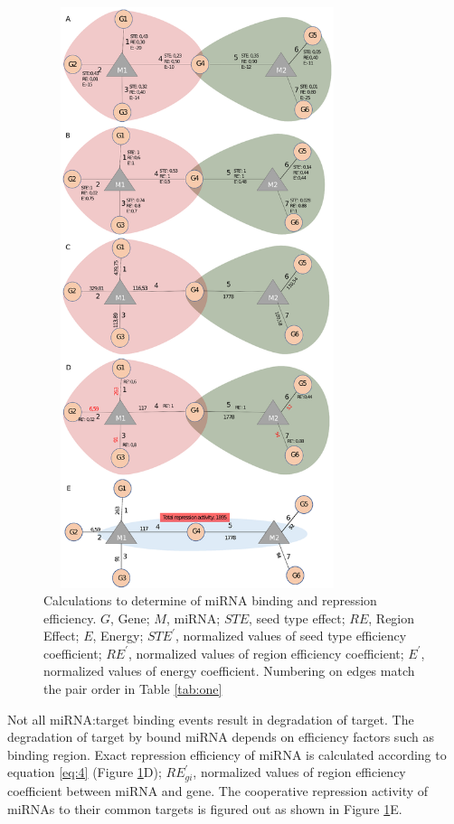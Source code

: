 \documentclass[a4,center,fleqn]{NAR}
\begin{document}
\begin{figure}[ht]
\begin{center}
\includegraphics[width=9cm,height=17cm]{fig2_new.eps}
\end{center}
\caption{Calculations to determine of miRNA binding and repression efficiency. $G$, Gene; $M$, miRNA; $STE$, seed type effect; $RE$, Region Effect; $E$, Energy; $STE^\prime$, normalized values of seed type efficiency coefficient; $RE^\prime$, normalized values of region efficiency coefficient; $E^\prime$, normalized values of energy coefficient. Numbering on edges match the pair order in Table \ref{tab:one} }
\label{fig:fig2}
\end{figure}

Not all miRNA:target binding events result in degradation of target. The
degradation of target by bound miRNA depends on efficiency factors such
as binding region. Exact repression efficiency of miRNA is calculated
according to equation \eqref{eq:4} (Figure \ref{fig:fig2}D);
\(RE^\prime_{gi}\), normalized values of region efficiency coefficient
between miRNA and gene. The cooperative repression activity of miRNAs to
their common targets is figured out as shown in Figure \ref{fig:fig2}E.
\end{document}
